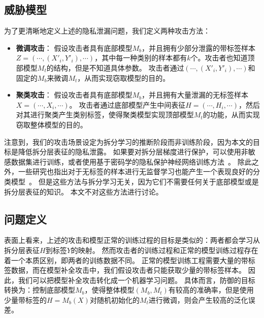 \subsection{威胁模型}
为了更清晰地定义上述的隐私泄漏问题，我们定义两种攻击方法：
\begin{itemize}
    \item \textbf{微调攻击}：
    假设攻击者具有底部模型$M_b$，并且拥有少部分泄露的带标签样本$Z = (\cdots, (X'_i, Y'_i), \cdots)$，其中每一种类别的样本都有$k$个。攻击者也知道顶部模型$M_t$的结构，但是不知道具体参数。
    攻击者通过$(\cdots, (X'_i, Y'_i), \cdots)$和固定的$M_b$来微调$M_t$，从而实现窃取模型的目的。

    \item \textbf{聚类攻击}：
    假设攻击者具有底部模型$M_b$，并且拥有大量泄漏的无标签样本$X = (\cdots, X_i, \cdots)$。
    攻击者通过底部模型产生中间表征$H = (\cdots, H_i, \cdots)$，然后对其进行聚类产生类别标签，使得聚类模型实现顶部模型$M_t$的功能，从而实现窃取整体模型的目的。
\end{itemize}

注意到，我们的攻击场景设定为拆分学习的推断阶段而非训练阶段，因为本文的目标是降低拆分层表征的隐私泄露。
%
如果要对拆分层梯度进行保护，可以使用非敏感数据集进行训练，或者使用基于密码学的隐私保护神经网络训练方法~\cite{mohassel2017secureml,wagh2019securenn}。
%
除此之外，一些研究也指出对于无标签的样本进行无监督学习也能产生一个表现良好的分类模型~\cite{berthelot2019mixmatch,xuyi2021dp_ssl}。
但是这些方法与拆分学习无关，因为它们不需要任何关于底部模型或是拆分层表征的知识。
本文不对这些方法进行讨论。
%

\subsection{问题定义}
表面上看来，上述的攻击和模型正常的训练过程的目标是类似的：两者都会学习从拆分层表征$H$到标签$Y$的映射。
%
然而攻击者的训练过程和正常的模型训练过程存在着一个本质区别，即两者的训练数据不同。
正常的模型训练工程需要大量的带标签数据，而在模型补全攻击中，我们假设攻击者只能获取少量的带标签样本。
%
因此，我们可以把模型补全攻击转化成一个机器学习问题。
具体而言，防御的目标转换为：控制底部模型$M_b$，使得整体模型$(M_b, M_t)$有较高的准确率，但是使用少量带标签的$H = M_b(X)$对随机初始化的$M_t$进行微调，则会产生较高的泛化误差。
%

